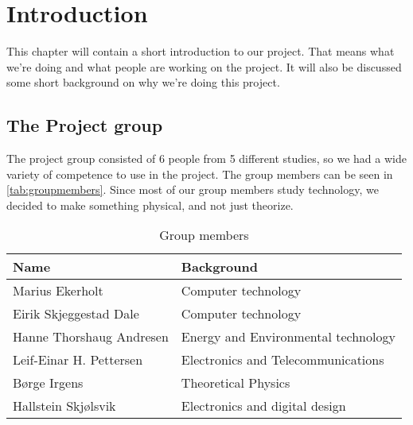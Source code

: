 \chapter{Introduction}
\label{chap:introduction}
This chapter will contain a short introduction to our project. That means what we're doing and what people are working on the project. It will also be discussed some short background on why we're doing this project.
\section{The Project group}
The project group consisted of 6 people from 5 different studies, so we had a wide variety of competence to use in the project. The group members can be seen in \autoref{tab:groupmembers}. Since most of our group members study technology, we decided to make something physical, and not just theorize.
\begin{table}
	\begin{center}
		\begin{tabular}{|p{4cm}|p{7cm}|}   
			\hline      
			\bf{Name} & \bf{Background} \\ 
			\hline
			Marius Ekerholt & Computer technology\\     
			\hline
			Eirik Skjeggestad Dale & Computer technology\\     
			\hline
			Hanne Thorshaug Andresen & Energy and Environmental technology\\     
			\hline
			Leif-Einar H. Pettersen & Electronics and Telecommunications\\     
			\hline
			Børge Irgens & Theoretical Physics\\     
			\hline
			Hallstein Skjølsvik & Electronics and digital design\\     
			\hline
		 \end{tabular}
	\end{center}
	\caption{Group members}
	\label{tab:groupmembers}
\end{table}








